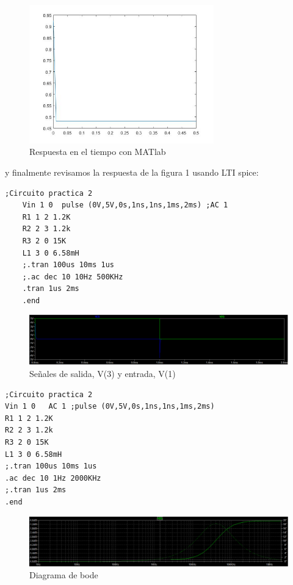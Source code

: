 \documentclass{report}
\newcounter{ns}
\begin{document}
	\begin{figure}[h]
		\centering
		\includegraphics[width=8cm]{graf}
		\caption{Respuesta en el tiempo con MATlab}\label{figura 1}
	\end{figure}

\newpage

	y finalmente revisamos la respuesta de la figura 1 usando LTI spice:
	
	\begin{lstlisting}[frame=single]
	;Circuito practica 2
	Vin 1 0  pulse (0V,5V,0s,1ns,1ns,1ms,2ms) ;AC 1
	R1 1 2 1.2K
	R2 2 3 1.2k
	R3 2 0 15K
	L1 3 0 6.58mH
	;.tran 100us 10ms 1us
	;.ac dec 10 10Hz 500KHz
	.tran 1us 2ms
	.end
	\end{lstlisting}
	
	\begin{figure}[h]
		\centering
		\includegraphics[width=15cm]{captura1}
		\caption{Señales de salida, V(3) y entrada, V(1)}\label{figura 2}
	\end{figure}

\begin{lstlisting}[frame=single]
;Circuito practica 2
Vin 1 0   AC 1 ;pulse (0V,5V,0s,1ns,1ns,1ms,2ms)
R1 1 2 1.2K
R2 2 3 1.2k
R3 2 0 15K
L1 3 0 6.58mH
;.tran 100us 10ms 1us
.ac dec 10 1Hz 2000KHz
;.tran 1us 2ms
.end
\end{lstlisting}

\begin{figure}[h]
	\centering
	\includegraphics[width=15cm]{captura3}
	\caption{Diagrama de bode}\label{figura 3}
\end{figure}
	
\end{document}
